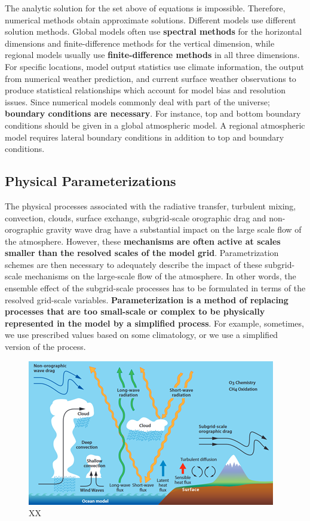 \documentclass[12pt,oneside]{book}
\begin{document}
The analytic solution for the set above of equations is impossible.
Therefore, numerical methods obtain approximate solutions. Different
models use different solution methods. Global models often use
\textbf{spectral methods} for the horizontal dimensions and
finite-difference methods for the vertical dimension, while regional
models usually use \textbf{finite-difference methods} in all three
dimensions. For specific locations, model output statistics use climate
information, the output from numerical weather prediction, and current
surface weather observations to produce statistical relationships which
account for model bias and resolution issues. Since numerical models
commonly deal with part of the universe; \textbf{boundary conditions are
necessary}. For instance, top and bottom boundary conditions should be
given in a global atmospheric model. A regional atmospheric model
requires lateral boundary conditions in addition to top and boundary
conditions.

\subsection{Physical
Parameterizations}\label{physical-parameterizations}

The physical processes associated with the radiative transfer, turbulent
mixing, convection, clouds, surface exchange, subgrid-scale orographic
drag and non-orographic gravity wave drag have a substantial impact on
the large scale flow of the atmosphere. However, these
\textbf{mechanisms are often active at scales smaller than the resolved
scales of the model grid}. Parametrization schemes are then necessary to
adequately describe the impact of these subgrid-scale mechanisms on the
large-scale flow of the atmosphere. In other words, the ensemble effect
of the subgrid-scale processes has to be formulated in terms of the
resolved grid-scale variables. \textbf{Parameterization is a method of
replacing processes that are too small-scale or complex to be physically
represented in the model by a simplified process}. For example,
sometimes, we use prescribed values based on some climatology, or we use
a simplified version of the process.

\begin{figure}

{\centering \includegraphics[width=0.8\linewidth]{figures/Figure72} 

}

\caption{XX}\label{fig:PhysicalParameterizations}
\end{figure}
\end{document}
